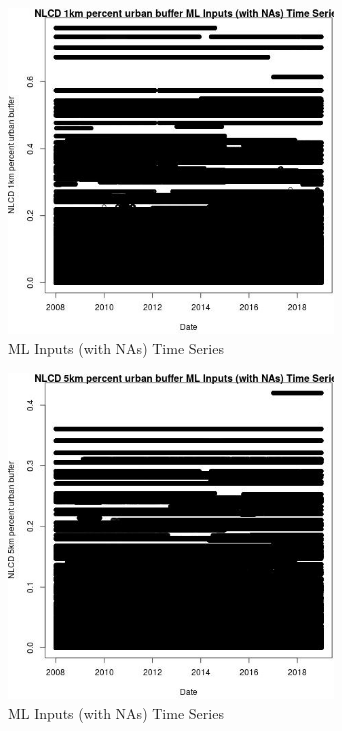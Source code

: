 \begin{figure} 
\centering  
\includegraphics[width=0.77\textwidth]{Code_Outputs/Report_ML_input_PM25_Step4_part_f_de_duplicated_aveswNAs_NLCD_1km_percent_urban_buffervDate.jpg} 
\caption{\label{fig:Report_ML_input_PM25_Step4_part_f_de_duplicated_aveswNAsNLCD_1km_percent_urban_buffervDate}ML Inputs (with NAs) Time Series} 
\end{figure} 
 

\clearpage 

\begin{figure} 
\centering  
\includegraphics[width=0.77\textwidth]{Code_Outputs/Report_ML_input_PM25_Step4_part_f_de_duplicated_aveswNAs_NLCD_5km_percent_urban_buffervDate.jpg} 
\caption{\label{fig:Report_ML_input_PM25_Step4_part_f_de_duplicated_aveswNAsNLCD_5km_percent_urban_buffervDate}ML Inputs (with NAs) Time Series} 
\end{figure} 
 


